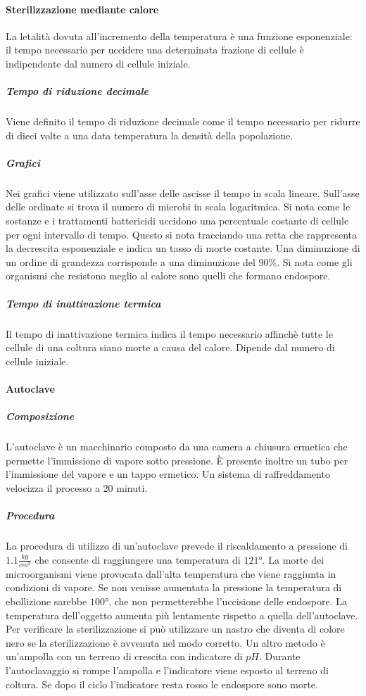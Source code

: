 			\paragraph{Sterilizzazione mediante calore}
			La letalit\`a dovuta all'incremento della temperatura \`e una funzione esponenziale: il tempo necessario per uccidere una determinata frazione di cellule \`e indipendente dal numero di cellule iniziale.
			
				\subparagraph{Tempo di riduzione decimale}
				Viene definito il tempo di riduzione decimale come il tempo necessario per ridurre di dieci volte a una data temperatura la densit\`a della popolazione.

				\subparagraph{Grafici}
				Nei grafici viene utilizzato sull'asse delle ascisse il tempo in scala lineare.
				Sull'asse delle ordinate si trova il numero di microbi in scala logaritmica.
				Si nota come le sostanze e i trattamenti battericidi uccidono una percentuale costante di cellule per ogni intervallo di tempo.
				Questo si nota tracciando una retta che rappresenta la decrescita esponenziale e indica un tasso di morte costante.
				Una diminuzione di un ordine di grandezza corrisponde a una diminuzione del $90\%$.
				Si nota come gli organismi che resistono meglio al calore sono quelli che formano endospore.

				\subparagraph{Tempo di inattivazione termica}
				Il tempo di inattivazione termica indica il tempo necessario affinch\`e tutte le cellule di una coltura siano morte a causa del calore.
				Dipende dal numero di cellule iniziale.

			\paragraph{Autoclave}

				\subparagraph{Composizione}
				L'autoclave \`e un macchinario composto da una camera a chiusura ermetica che permette l'immissione di vapore sotto pressione.
				\`E presente inoltre un tubo per l'immissione del vapore e un tappo ermetico.
				Un sistema di raffreddamento velocizza il processo a $20$ minuti.

				\subparagraph{Procedura}
				La procedura di utilizzo di un'autoclave prevede il riscaldamento a pressione di $1.1\frac{\si{kg}}{\si{cm^2}}$ che consente di raggiungere una temperatura di $121\si{\degree}$.
				La morte dei microorganismi viene provocata dall'alta temperatura che viene raggiunta in condizioni di vapore.
				Se non venisse aumentata la pressione la temperatura di ebollizione sarebbe $100\si{\degree}$, che non permetterebbe l'uccisione delle endospore.
				La temperatura dell'oggetto aumenta pi\`u lentamente rispetto a quella dell'autoclave.
				Per verificare la sterilizzazione si pu\`o utilizzare un nastro che diventa di colore nero se la sterilizzazione \`e avvenuta nel modo corretto.
				Un altro metodo \`e un'ampolla con un terreno di crescita con indicatore di $pH$.
				Durante l'autoclavaggio si rompe l'ampolla e l'indicatore viene esposto al terreno di coltura.
				Se dopo il ciclo l'indicatore resta rosso le endospore sono morte.
			

